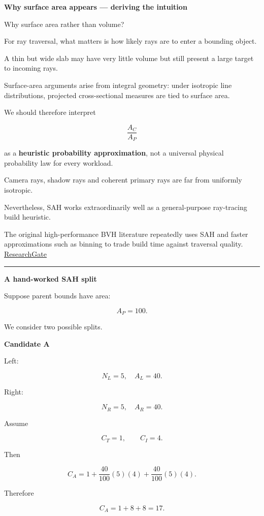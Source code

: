\textbf{Why surface area appears --- deriving the intuition}

Why surface area rather than volume?

For ray traversal, what matters is how likely rays are to enter a bounding object.

A thin but wide slab may have very little volume but still present a large target to incoming rays.

Surface-area arguments arise from integral geometry: under isotropic line distributions, projected cross-sectional measures are tied to surface area.

We should therefore interpret

\[
\frac{A_C}{A_P}
\]

as a \textbf{heuristic probability approximation}, not a universal physical probability law for every workload.

Camera rays, shadow rays and coherent primary rays are far from uniformly isotropic.

Nevertheless, SAH works extraordinarily well as a general-purpose ray-tracing build heuristic.

The original high-performance BVH literature repeatedly uses SAH and faster approximations such as binning to trade build time against traversal quality. \href{https://www.researchgate.net/publication/4278645_On_Fast_Construction_of_SAH_based_Bounding_Volume_Hierarchies?utm_source=chatgpt.com}{ResearchGate}

\begin{center}\rule{0.5\linewidth}{0.5pt}\end{center}

\textbf{A hand-worked SAH split}

Suppose parent bounds have area:

\[
A_P=100.
\]

We consider two possible splits.

\textbf{Candidate A}

Left:

\[
N_L=5,\quad A_L=40.
\]

Right:

\[
N_R=5,\quad A_R=40.
\]

Assume

\[
C_T=1,
\qquad
C_I=4.
\]

Then

\[
C_A
=
1+
\frac{40}{100}(5)(4)
+
\frac{40}{100}(5)(4).
\]

Therefore

\[
C_A=1+8+8=17.
\]

